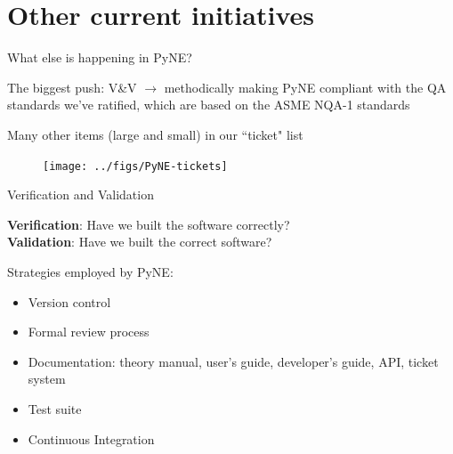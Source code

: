 \documentclass[xcolor=x11names,compress]{beamer}
\renewcommand{\(}{\begin{columns}}
\renewcommand{\)}{\end{columns}}
\newcommand{\<}[1]{\begin{column}{#1}}
\renewcommand{\>}{\end{column}}
\begin{document}
\section{Other current initiatives}
\begin{frame}{What else is happening in PyNE?}

    The biggest push: \alert{V\&V} $\rightarrow$ methodically making PyNE compliant
    with the QA standards we've ratified, which are based on the ASME NQA-1 standards
    \cite{pyne_vnv}

    \vspace*{1 em}
    Many other items (large and small) in our ``ticket" list

    \begin{center}
 	\begin{figure}
 	\texttt{[image: ../figs/PyNE-tickets]}
    \end{figure}
 	\end{center}

\end{frame}

\begin{frame}{Verification and Validation}

    \textbf{Verification}: Have we built the software correctly?\\
    \textbf{Validation}: Have we built the correct software?

    \vspace*{1 em}
    Strategies employed by PyNE:

    \begin{itemize}
      \item Version control
      \item Formal review process
      \item Documentation: theory manual, user's guide, developer's guide, API,
      ticket system
      \item Test suite
      \item Continuous Integration
    \end{itemize}

\end{frame}
\end{document}
